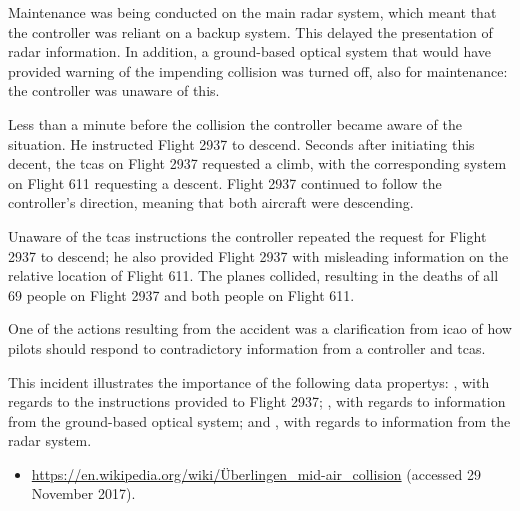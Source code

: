 Maintenance was being conducted on the main radar system, which meant that the controller was reliant on a backup system. This delayed the presentation of radar \gls{information}. In addition, a ground-based optical system that would have provided warning of the impending collision was turned off, also for maintenance: the controller was unaware of this.

Less than a minute before the collision the controller became aware of the situation. He instructed Flight 2937 to descend. Seconds after initiating this decent, the \gls{tcas} on Flight 2937 requested a climb, with the corresponding system on Flight 611 requesting a descent. Flight 2937 continued to follow the controller's direction, meaning that both aircraft were descending.

Unaware of the \gls{tcas} instructions the controller repeated the request for Flight 2937 to descend; he also provided Flight 2937 with misleading \gls{information} on the relative location of Flight 611. The planes collided, resulting in the deaths of all 69 people on Flight 2937 and both people on Flight 611.

One of the actions resulting from the accident was a clarification from \gls{icao} of how pilots should respond to contradictory \gls{information} from a controller and \gls{tcas}.

This incident illustrates the importance of the following \glspl{data property}: , with regards to the instructions provided to Flight 2937; , with regards to \gls{information} from the ground-based optical system; and , with regards to \gls{information} from the radar system.

\begin{samepage}
\begin{itemize}
	\item \raggedright{\href{https://en.wikipedia.org/wiki/\%C3\%9Cberlingen_mid-air_collision}{https://en.wikipedia.org/wiki/\"Uberlingen\_mid-air\_collision} (accessed 29 November 2017).}
\end{itemize}
\end{samepage}


